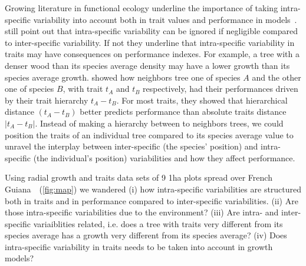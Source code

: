Growing literature in functional ecology underline the importance of taking intra-specific variability into account both in trait values and performance in models~\citep{violle_towards_2009, clark_high-dimensional_2010, albert_when_2011, violle_return_2012}.~\citet{albert_when_2011} still point out that intra-specific variability can be ignored if negligible compared to inter-specific variability. If not they underline that intra-specific variability in traits may have consequences on performance indexes. For example, a tree with a denser wood than its species average density may have a lower growth than its species average growth. \citet{kunstler_competitive_2012} showed how neighbors tree one of species $A$ and the other one of species $B$, with trait $t_A$ and $t_B$ respectively, had their performances driven by their trait hierarchy $t_A - t_B$. For most traits, they showed that hierarchical distance $(t_A - t_B)$ better predicts performance than absolute traits distance $\vert t_A - t_B \vert$. Instead of making a hierarchy between to neighbors trees, we could position the traits of an individual tree compared to its species average value to unravel the interplay between inter-specific (the species' position) and intra-specific (the individual's position) variabilities and how they affect performance.
\vspace{-\parskip}

Using radial growth and traits data sets of 9 1ha plots spread over French Guiana~\citep{baraloto_decoupled_2010}~(\autoref{fig:map}) we wandered (i) how intra-specific variabilities are structured both in traits and in performance compared to inter-specific variabilities. (ii) Are those intra-specific variabilities due to the environment? (iii) Are intra- and inter- specific variaiblities related, i.e. does a tree with traits very different from its species average has a growth very different from its species average? (iv) Does intra-specific variability in traits needs to be taken into account in growth models?